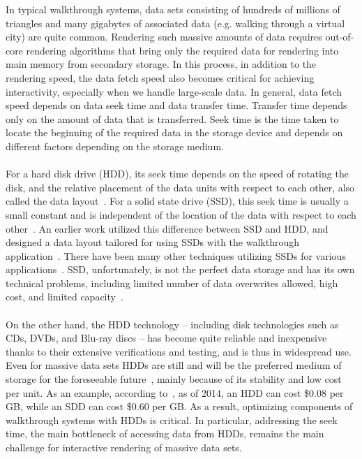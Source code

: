In typical walkthrough systems, data sets consisting of hundreds of millions of
triangles and many gigabytes of associated data (e.g. walking through a virtual
city) are quite common. Rendering such massive amounts of data requires
out-of-core rendering algorithms that bring only the required data for
rendering into main memory from secondary storage. In this process, in addition
to the rendering speed, the data fetch speed also becomes critical for
achieving interactivity, especially when we handle large-scale data. In
general, data fetch speed depends on data seek time and data transfer time.
Transfer time depends only on the amount of data that is transferred. Seek time
is the time taken to locate the beginning of the required data in the storage
device and depends on different factors depending on the storage medium. \\
\\
For a hard disk drive (HDD), its seek time depends on the speed of rotating the
disk,
and the relative placement of the data units with respect to each other, also
called the data layout~\cite{Rizvi10}. For a solid state drive (SSD), this seek
time is usually a small constant and is independent of the location of the data
with respect to each other~\cite{SSD_perf08}. An earlier work utilized this
difference between SSD and HDD, and designed a data layout tailored for using
SSDs with the walkthrough application~\cite{ssdpaper}. There have been many
other techniques utilizing SSDs for various applications~\cite{FlashVM09}. SSD,
unfortunately, is not the perfect data storage and has its own technical
problems, including limited number of data overwrites allowed, high cost, and
limited capacity~\cite{Rizvi10}.  \\
\\
On the other hand, the HDD technology -- including disk technologies such as
CDs, DVDs, and Blu-ray discs -- has become quite reliable and inexpensive
thanks to their extensive verifications and testing, and is thus in widespread
use.  Even for massive data sets HDDs are still and will be
the preferred medium of storage for the foreseeable future~\cite{Rizvi10},
mainly
because of its stability and low cost per unit. As an example, according
to~\cite{pcmagarticle}, as of 2014, an HDD can cost \$0.08 per GB, while an SDD
can cost \$0.60 per GB. As a result, optimizing components of walkthrough
systems with HDDs is critical. In particular, addressing the seek time, the
main bottleneck of accessing data from HDDs, remains the main challenge for
interactive rendering of massive data sets. \\
